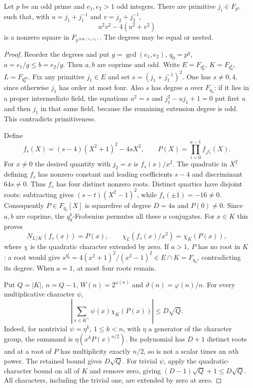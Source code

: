 \begin{theorem}\label{E.PrimitiveSquare}
Let $p$ be an odd prime and $e_1,e_2>1$ odd integers. There are primitive
$j_i\in F_{p^{e_i}}$ such that, with $u=j_1+j_1^{-1}$ and
$v=j_2+j_2^{-1}$,
\[
 u^2v^2-4(u^2+v^2)
\]
is a nonzero square in $F_{p^{\operatorname{lcm}(e_1,e_2)}}$.
The degrees may be equal or nested.
\end{theorem}
\begin{proof}
Reorder the degrees and put $g=\gcd(e_1,e_2)$, $q_0=p^g$,
$a=e_1/g\le b=e_2/g$. Then $a,b$ are coprime and odd. Write
$E=F_{q_0^a}$, $K=F_{q_0^b}$, $L=F_{q_0^{ab}}$.
Fix any primitive $j_1\in E$ and set $s=(j_1+j_1^{-1})^2$.
One has $s\ne0,4$, since otherwise $j_1$ has order at most four.
Also $s$ has degree $a$ over $F_{q_0}$: if it lies in a proper
intermediate field, the equations $u^2=s$ and $j_1^2-uj_1+1=0$
put first $u$ and then $j_1$ in that same field, because the remaining
extension degree is odd. This contradicts primitiveness.

Define
\[
 f_s(X)=(s-4)(X^2+1)^2-4sX^2,
 \qquad P(X)=\prod_{i=0}^{a-1}f_{s^{q_0^i}}(X).
\]
For $x\ne0$ the desired quantity with $j_2=x$ is $f_s(x)/x^2$.
The quadratic in $X^2$ defining $f_s$ has nonzero constant and leading
coefficients $s-4$ and discriminant $64s\ne0$. Thus $f_s$ has four
distinct nonzero roots. Distinct quartics have disjoint roots: subtracting
gives $(s-t)(X^2-1)^2$, while $f_s(\pm1)=-16\ne0$.
Consequently $P\in F_{q_0}[X]$ is squarefree of degree $D=4a$ and
$P(0)\ne0$. Since $a,b$ are coprime, the $q_0^b$-Frobenius permutes
all these $a$ conjugates. For $x\in K$ this proves
\[
 N_{L/K}(f_s(x))=P(x),\qquad
 \chi_L(f_s(x)/x^2)=\chi_K(P(x)),
\]
where $\chi$ is the quadratic character extended by zero.
If $a>1$, $P$ has no root in $K$: a root would give
$s^{q_0^i}=4(x^2+1)^2/(x^2-1)^2\in E\cap K=F_{q_0}$,
contradicting its degree. When $a=1$, at most four roots remain.

Put $Q=|K|$, $n=Q-1$, $W(n)=2^{\omega(n)}$ and
$\vartheta(n)=\varphi(n)/n$. For every multiplicative character $\psi$,
\[
 \left|\sum_{x\in K^\times}\psi(x)\chi_K(P(x))\right|
 \le D\sqrt Q.                                             \tag{20}
\]
Indeed, for nontrivial $\psi=\eta^k$, $1\le k<n$, with $\eta$ a
generator of the character group, the summand is
$\eta(x^kP(x)^{n/2})$. Its polynomial has $D+1$ distinct roots and
at a root of $P$ has multiplicity exactly $n/2$, so is not a scalar
times an $n$th power. The retained bound gives $D\sqrt Q$.
For trivial $\psi$, apply the quadratic-character bound on all of $K$
and remove zero, giving $(D-1)\sqrt Q+1\le D\sqrt Q$.
All characters, including the trivial one, are extended by zero at zero.


\end{proof}
